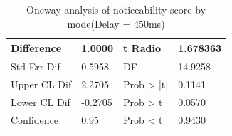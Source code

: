 \begin{table} [!htbp]
\begin{tabular}{|p{}|p{}|p{}|p{}|}
\hline 
Difference & 1.0000 & t Radio & 1.678363 \\
\hline
Std Err Dif & 0.5958 & DF & 14.9258 \\
\hline
Upper CL Dif & 2.2705 & Prob > |t| & 0.1141 \\
\hline
Lower CL Dif & -0.2705 & Prob > t & 0.0570 \\
\hline
Confidence & 0.95 & Prob < t & 0.9430 \\
\hline
\end{tabular}
\caption{Oneway analysis of noticeability score by mode(Delay = 450ms)}
\label{tab:table_questionnaire}
\end{table}

